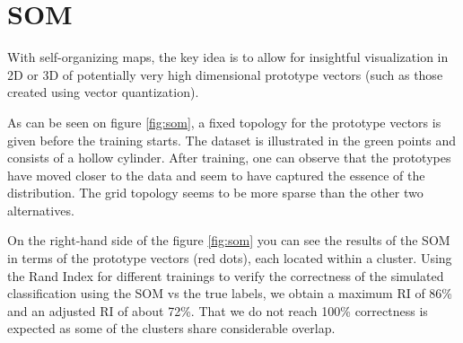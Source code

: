 \documentclass[11pt, a4paper]{article}
\begin{document}
\section{SOM}
With self-organizing maps, the key idea is to allow for insightful
visualization in 2D or 3D of potentially very high dimensional
prototype vectors (such as those created using vector quantization).

As can be seen on figure \ref{fig:som}, a fixed topology for the
prototype vectors is given before the training starts. The dataset is
illustrated in the green points and consists of a hollow
cylinder. After training, one can observe that the prototypes have
moved closer to the data and seem to have captured the essence of the
distribution. The grid topology seems to be more sparse than the other
two alternatives.

On the right-hand side of the figure \ref{fig:som} you can see the
results of the SOM in terms of the prototype vectors (red dots), each
located within a cluster. Using the Rand Index for different trainings
to verify the correctness of the simulated classification using the
SOM vs the true labels, we obtain a maximum RI of 86\% and an adjusted
RI of about 72\%. That we do not reach 100\% correctness is expected
as some of the clusters share considerable overlap.
\end{document}
